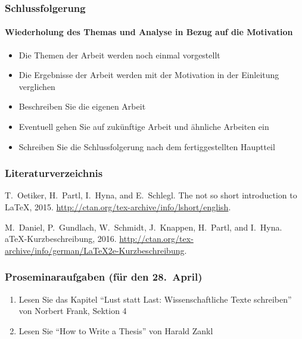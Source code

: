 \begin{frame}
\frametitle{Schlussfolgerung}
\framesubtitle{Wiederholung des Themas und Analyse in Bezug auf die Motivation}

\begin{itemize}
\item<2-> Die Themen der Arbeit werden noch einmal vorgestellt
\item<3-> Die Ergebnisse der Arbeit werden mit der Motivation in der Einleitung
  verglichen
\item<4-> Beschreiben Sie die eigenen Arbeit
\item<5-> Eventuell gehen Sie auf zukünftige Arbeit und ähnliche Arbeiten ein
\item<6-> Schreiben Sie die Schlussfolgerung nach dem fertiggestellten Hauptteil
\end{itemize}

\bigskip
\begin{Beispiel}
\end{Beispiel}
\end{frame}

\begin{frame}
\frametitle{Literaturverzeichnis}
\small
% 
% 
\begin{thebibliography}{1}

T.~Oetiker, H.~Partl, I.~Hyna, and E.~Schlegl.
\newblock The not so short introduction to {L}a{T}e{X}, 2015.
\newblock \url{http://ctan.org/tex-archive/info/lshort/english}.

M.~Daniel, P.~Gundlach, W.~Schmidt, J.~Knappen, H.~Partl, and I.~Hyna.
a{T}e{X}-{K}urzbeschreibung, 2016.
\newblock \url{http://ctan.org/tex-archive/info/german/LaTeX2e-Kurzbeschreibung}.

\end{thebibliography}

\end{frame}

\begin{frame}
\frametitle{Proseminaraufgaben (für den 28.~April)}    

\begin{enumerate}
\item<2-> Lesen Sie das Kapitel \enquote{Lust statt Last: Wissenschaftliche Texte schreiben}
von Norbert Frank, Sektion 4
\item<3-> Lesen Sie \enquote{How to Write a Thesis} von Harald Zankl
\end{enumerate}
\end{frame}

